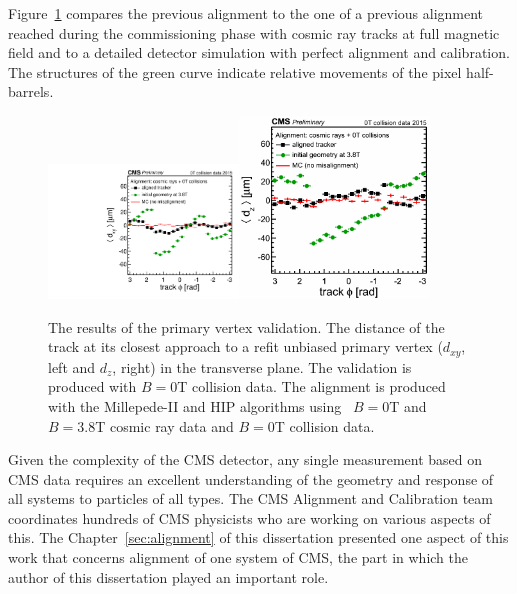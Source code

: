 Figure~\ref{fig:PVvalidation} compares the previous alignment to the one of a previous alignment reached during the commissioning phase with cosmic ray tracks at full magnetic field and to a detailed detector simulation with perfect alignment and calibration. The structures of the green curve indicate relative movements of the pixel half-barrels.

\begin{figure}[htb]
    \begin{center}
        \includegraphics[width=0.45\textwidth]{../figs/Alignment/AlRes_dxyPhiBiasCanvas.pdf}\includegraphics[width=0.45\textwidth]{../figs/Alignment/AlRes_dzPhiBiasCanvas.png}
    \end{center}
    \caption{The results of the primary vertex validation. The distance of the track at its closest approach to a refit unbiased primary vertex ($d_{xy}$, left and $d_z$, right) in the transverse plane. The validation is produced with $B=0$T collision data. The alignment is produced with the Millepede-II and HIP algorithms using ~$B=0$T and~$B=3.8$T cosmic ray data and $B=0$T collision data. }
    \label{fig:PVvalidation}
\end{figure}


Given the complexity of the CMS detector, any single measurement based on CMS data requires an excellent understanding of the geometry and response of all systems to particles of all types. The CMS Alignment and Calibration team coordinates hundreds of CMS physicists who are working on various aspects of this. The Chapter~\ref{sec:alignment} of this dissertation presented one aspect of this work that concerns alignment of one system of CMS, the part in which the author of this dissertation played an important role.
